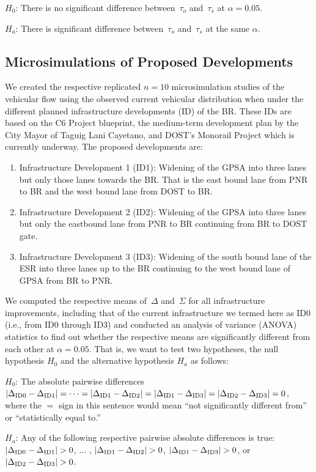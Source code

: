 \documentclass[preprint]{./acm_proc_article-sp}
\begin{document}
$H_0$: There is no significant difference between~$\tau_o$ and~$\tau_s$ at $\alpha=0.05$.

$H_a$: There is significant difference between~$\tau_o$ and~$\tau_s$ at the same $\alpha$.

\subsection{Microsimulations of Proposed Developments}

We created the respective replicated $n=10$ microsimulation studies of the vehicular flow using the observed current vehicular distribution when under the different planned infrastructure developments (ID) of the BR. These IDs are based on the C6 Project blueprint, the medium-term development plan by the City Mayor of Taguig Lani Cayetano, and DOST's Monorail Project which is currently underway. The proposed developments are:
\begin{enumerate}
\item Infrastructure Development 1 (ID1): Widening of the GPSA into three lanes but only those lanes towards the BR. That is the east bound lane from PNR to BR and the west bound lane from DOST to BR.
\item Infrastructure Development 2 (ID2): Widening of the GPSA into three lanes but only the eastbound lane from PNR to BR continuing from BR to DOST gate.
\item Infrastructure Development 3 (ID3): Widening of the south bound lane of the ESR into three lanes up to the BR continuing to the west bound lane of GPSA from BR to PNR.
\end{enumerate}
We computed the respective means of~$\Delta$ and~$\Sigma$ for all infrastructure improvements, including that of the current infrastructure we termed here as ID0 (i.e., from ID0 through ID3) and conducted an analysis of variance (ANOVA) statistics to find out whether the respective means are significantly different from each other at $\alpha=0.05$. That is, we want to test two hypotheses, the null hypothesis $H_0$ and the alternative hypothesis $H_a$ as follows:

$H_0$: The absolute pairwise differences  $|\Delta_{\rm ID0} - \Delta_{\rm ID1}| = \dots = |\Delta_{\rm ID1} - \Delta_{\rm ID2}| = |\Delta_{\rm ID1} - \Delta_{\rm ID3}| = |\Delta_{\rm ID2} - \Delta_{\rm ID3}| = 0$, where the $=$ sign in this sentence would mean ``not significantly different from'' or ``statistically equal to.''

$H_a$: Any of the following respective pairwise absolute differences is true: $|\Delta_{\rm ID0} - \Delta_{\rm ID1}| > 0$, $\dots$ , $|\Delta_{\rm ID1} - \Delta_{\rm ID2}| > 0$, $|\Delta_{\rm ID1} - \Delta_{\rm ID3}| > 0$,  or $|\Delta_{\rm ID2} - \Delta_{\rm ID3}| > 0$.
\end{document}
